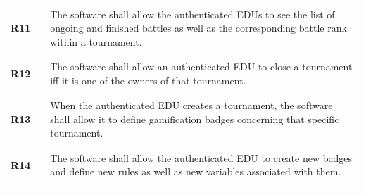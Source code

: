 \begin{longtable}[H]{l l p{12cm}}
    \textbf{R11} & \vline & The software shall allow the authenticated EDUs to see the list of ongoing and finished battles as well as the corresponding battle rank within a tournament.                                                                                                                   \\
                 &        &                                                                                                                                                                                                                                                                                 \\\hline & & \\
    \textbf{R12} & \vline & The software shall allow an authenticated EDU to close a tournament iff it is one of the owners of that tournament.                                                                                                                                                             \\
                 &        &                                                                                                                                                                                                                                                                                 \\\hline & & \\
    \textbf{R13} & \vline & When the authenticated EDU creates a tournament, the software shall allow it to define gamification badges concerning that specific tournament.                                                                                                                                 \\
                 &        &                                                                                                                                                                                                                                                                                 \\\hline & & \\
    \textbf{R14} & \vline & The software shall allow the authenticated EDU to create new badges and define new rules as well as new variables associated with them.                                                                                                                                         \\
                 &        &                                                                                                                                                                                                                                                                                 \\\hline & & \\

\end{longtable}
